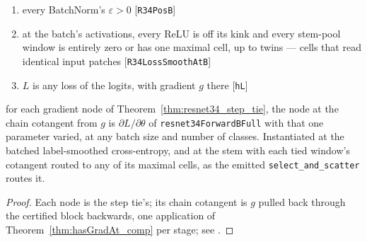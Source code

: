 \begin{theorem}
  \label{thm:resnet34_loss_grad}
  \leanok
  \Assume{}
  \begin{enumerate}
    \item every BatchNorm's \(\varepsilon > 0\) \hfill[\texttt{R34PosB}]
    \item at the batch's activations, every ReLU is off its kink and every
          stem-pool window is entirely zero or has one maximal cell, up to
          twins --- cells that read identical input patches
          \hfill[\texttt{R34LossSmoothAtB}]
    \item \(L\) is any loss of the logits, with gradient \(g\) there
          \hfill[\texttt{hL}]
  \end{enumerate}
  \Prove{} for each gradient node of Theorem~\ref{thm:resnet34_step_tie}, the
  node at the chain cotangent from \(g\) is \(\partial L/\partial\theta\) of
  \texttt{resnet34ForwardBFull} with that one parameter varied, at any batch
  size and number of classes. Instantiated at the batched label-smoothed
  cross-entropy, and at the stem with each tied window's cotangent routed to
  any of its maximal cells, as the emitted \texttt{select\_and\_scatter}
  routes it.
\end{theorem}

\begin{proof}
\leanok
Each node is the step tie's; its chain cotangent is \(g\) pulled back
through the certified block backwards, one application of
Theorem~\ref{thm:hasGradAt_comp} per stage; see
.
\end{proof}

